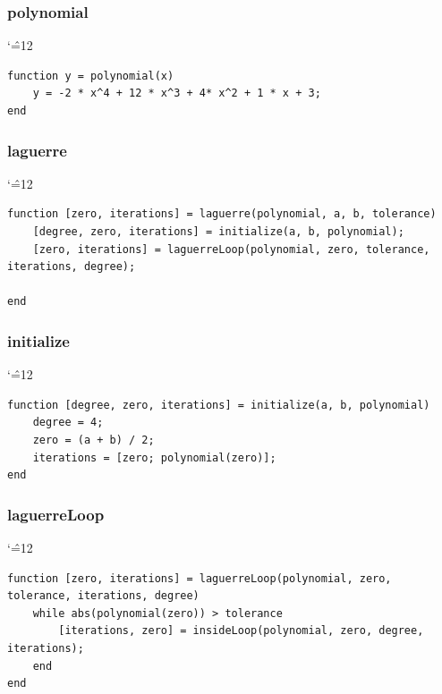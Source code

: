 \documentclass[12pt]{report}
\newenvironment{simplechar}{%
   \catcode`\^=12
}{}
\begin{document}
\subsubsection{polynomial}
\begin{simplechar}
\begin{lstlisting}
function y = polynomial(x)
    y = -2 * x^4 + 12 * x^3 + 4* x^2 + 1 * x + 3;
end
\end{lstlisting}
\end{simplechar}

\subsubsection{laguerre}
\begin{simplechar}
\begin{lstlisting}
function [zero, iterations] = laguerre(polynomial, a, b, tolerance)
    [degree, zero, iterations] = initialize(a, b, polynomial);
    [zero, iterations] = laguerreLoop(polynomial, zero, tolerance, iterations, degree);

end
\end{lstlisting}
\end{simplechar}

\newpage
\subsubsection{initialize}
\begin{simplechar}
\begin{lstlisting}
function [degree, zero, iterations] = initialize(a, b, polynomial)
    degree = 4;
    zero = (a + b) / 2;
    iterations = [zero; polynomial(zero)];
end
\end{lstlisting}
\end{simplechar}

\subsubsection{laguerreLoop}
\begin{simplechar}
\begin{lstlisting}
function [zero, iterations] = laguerreLoop(polynomial, zero, tolerance, iterations, degree)
    while abs(polynomial(zero)) > tolerance
        [iterations, zero] = insideLoop(polynomial, zero, degree, iterations);
    end
end
\end{lstlisting}
\end{simplechar}
\end{document}
